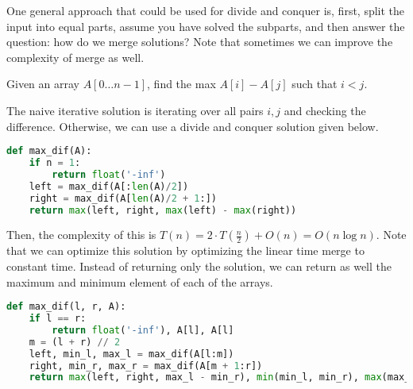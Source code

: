 
One general approach that could be used for divide and conquer is, first, split the input into equal parts, assume you have solved the subparts, and then answer the question: how do we merge solutions? Note that sometimes we can improve the complexity of merge as well.

\begin{eg}
	Given an array \( A[0\ldots n-1] \), find the max \( A[i] - A[j] \) such that \( i<j \).
\end{eg}
\begin{explanation}
	The naive iterative solution is iterating over all pairs \( i,j \) and checking the difference. Otherwise, we can use a divide and conquer solution given below.
\end{explanation}

\begin{lstlisting}[language=Python]
def max_dif(A):
	if n = 1:
		return float('-inf')
	left = max_dif(A[:len(A)/2])
	right = max_dif(A[len(A)/2 + 1:])
	return max(left, right, max(left) - max(right))
\end{lstlisting}

Then, the complexity of this is \( T(n) = 2\cdot T(\frac{n}{2}) + O(n) = O(n\log n)\). Note that we can optimize this solution by optimizing the linear time merge to constant time. Instead of returning only the solution, we can return as well the maximum and minimum element of each of the arrays.

\begin{lstlisting}[language=Python]
def max_dif(l, r, A):
	if l == r:
		return float('-inf'), A[l], A[l]
	m = (l + r) // 2
	left, min_l, max_l = max_dif(A[l:m])
	right, min_r, max_r = max_dif(A[m + 1:r])
	return max(left, right, max_l - min_r), min(min_l, min_r), max(max_l, max_r)
\end{lstlisting}
